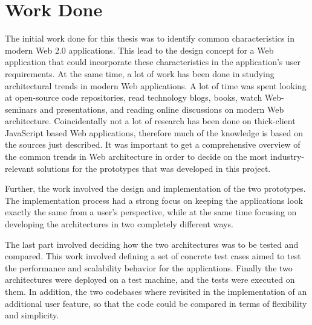 \section{Work Done}
The initial work done for this thesis was to identify common characteristics in modern Web 2.0 applications. This lead to the design concept for a Web application that could incorporate these characteristics in the application's user requirements. At the same time, a lot of work has been done in studying architectural trends in modern Web applications. A lot of time was spent looking at open-source code repositories, read technology blogs, books, watch Web-seminars and presentations, and reading online discussions on modern Web architecture. Coincidentally not a lot of research has been done on thick-client JavaScript based Web applications, therefore much of the knowledge is based on the sources just described. It was important to get a comprehensive overview of the common trends in Web architecture in order to decide on the most industry-relevant solutions for the prototypes that was developed in this project.

Further, the work involved the design and implementation of the two prototypes. The implementation process had a strong focus on keeping the applications look exactly the same from a user's perspective, while at the same time focusing on developing the architectures in two completely different ways.

The last part involved deciding how the two architectures was to be tested and compared. This work involved defining a set of concrete test cases aimed to test the performance and scalability behavior for the applications. Finally the two architectures were deployed on a test machine, and the tests were executed on them. In addition, the two codebases where revisited in the implementation of an additional user feature, so that the code could be compared in terms of flexibility and simplicity. 

